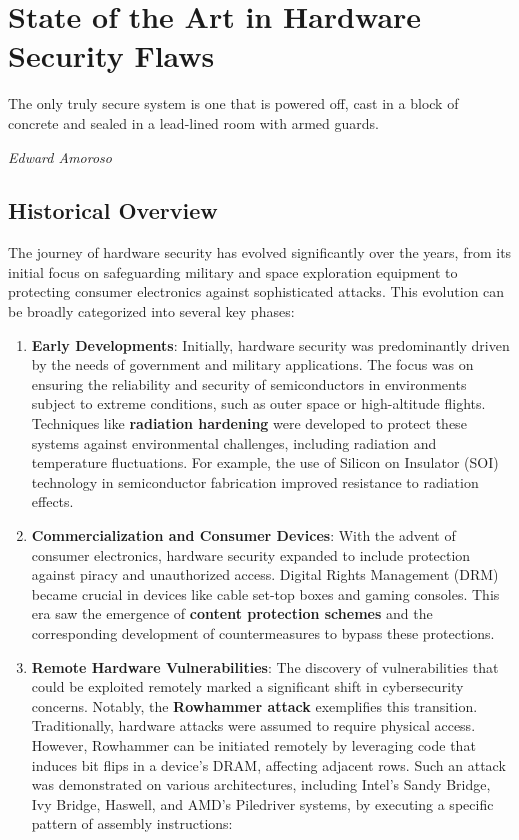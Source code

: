 \chapter{State of the Art in Hardware Security Flaws}
\epigraph{The only truly secure system is one that is powered off, cast in a block of concrete and sealed in a lead-lined room with armed guards.}{\textit{Edward Amoroso}}

\hypertarget{historical-overview}{%
\section{Historical Overview}\label{historical-overview}}

The journey of hardware security has evolved significantly over the
years, from its initial focus on safeguarding military and space
exploration equipment to protecting consumer electronics against
sophisticated attacks. This evolution can be broadly categorized into
several key phases:

\begin{enumerate}
\def\labelenumi{\arabic{enumi}.}
\item
  \textbf{Early Developments}: Initially, hardware security was
  predominantly driven by the needs of government and military
  applications. The focus was on ensuring the reliability and security
  of semiconductors in environments subject to extreme conditions, such
  as outer space or high-altitude flights. Techniques like
  \textbf{radiation hardening}\cite{RadiationHardening2024} were developed to protect these systems
  against environmental challenges, including radiation and temperature
  fluctuations. For example, the
  use of Silicon on Insulator (SOI) technology in semiconductor
  fabrication improved resistance to radiation effects.
\item
  \textbf{Commercialization and Consumer Devices}: With the advent of
  consumer electronics, hardware security expanded to include protection
  against piracy and unauthorized access. Digital Rights Management
  (DRM) became crucial in devices like cable set-top boxes and gaming
  consoles. This era saw the emergence of \textbf{content protection
  schemes} and the corresponding development of countermeasures to
  bypass these protections.\cite{DigitalRightsManagement2024}
\item
  \textbf{Remote Hardware Vulnerabilities}: The discovery of
  vulnerabilities that could be exploited remotely marked a significant
  shift in cybersecurity concerns. Notably, the \textbf{Rowhammer
  attack} exemplifies this transition. Traditionally, hardware attacks
  were assumed to require physical access. However, Rowhammer can be
  initiated remotely by leveraging code that induces bit flips in a
  device's DRAM, affecting adjacent rows. Such an attack was
  demonstrated on various architectures, including Intel's Sandy Bridge,
  Ivy Bridge, Haswell, and AMD's Piledriver systems, by executing a
  specific pattern of assembly instructions:
\end{enumerate}

